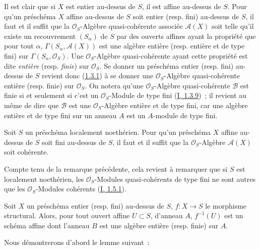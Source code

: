 \begin{env}[6.1.2]
\label{II.6.1.2-fr}
Il est clair que si $X$ est entier au-dessus de $S$, il est affine au-dessus
de $S$. Pour qu'un préschéma $X$ affine au-dessus de $S$ soit entier (resp.
fini) au-dessus de $S$, il faut et il suffit que la $\mathcal{O}_S$-Algèbre
quasi-cohérente associée $\mathcal{A}(X)$ soit telle qu'il existe un
recouvrement $(S_\alpha)$ de $S$ par des ouverts affines ayant la propriété
que pour tout $\alpha$, $\Gamma(S_\alpha,\mathcal{A}(X))$ est une algèbre
entière (resp. entière et de type fini) sur
$\Gamma(S_\alpha,\mathcal{O}_S)$. Une $\mathcal{O}_S$-Algèbre quasi-cohérente
ayant cette propriété est dite \emph{entière} (resp. \emph{finie}) sur
$\mathcal{O}_S$. Se donner un préschéma entier (resp. fini) au-dessus de $S$
revient donc (\hyperref[II.1.3.1-fr]{1.3.1}) à se donner une
$\mathcal{O}_S$-Algèbre quasi-cohérente entière (resp. finie) sur
$\mathcal{O}_S$. On notera qu'une $\mathcal{O}_S$-Algèbre quasi-cohérente
$\mathcal{B}$ est finie si et seulement si c'est un $\mathcal{O}_S$-Module de
type fini (\hyperref[I.1.3.9-fr]{I, 1.3.9})~; il revient au même de dire que
$\mathcal{B}$ est une $\mathcal{O}_S$-Algèbre entière et de type fini, car une
algèbre entière et de type fini sur un anneau $A$ est un $A$-module de type
fini.
\end{env}

\begin{proposition}[6.1.3]
\label{II.6.1.3-fr}
Soit $S$ un préschéma localement noethérien. Pour qu'un préschéma $X$ affine
au-dessus de $S$ soit fini au-dessus de $S$, il faut et il suffit que la
$\mathcal{O}_S$-Algèbre $\mathcal{A}(X)$ soit cohérente.
\end{proposition}

Compte tenu de la remarque précédente, cela revient à remarquer que si $S$ est
localement noethérien, les $\mathcal{O}_S$-Modules quasi-cohérents de type fini
ne sont autres que les $\mathcal{O}_S$-Modules cohérents
(\hyperref[I.1.5.1-fr]{I, 1.5.1}).

\begin{proposition}[6.1.4]
\label{II.6.1.4-fr}
Soit $X$ un préschéma entier (resp. fini) au-dessus de $S$, $f:X\to S$ le
morphisme structural. Alors, pour tout ouvert affine $U\subset S$, d'anneau
$A$, $f^{-1}(U)$ est un schéma affine dont l'anneau $B$ est une algèbre
entière (resp. finie) sur $A$.
\end{proposition}


Nous démontrerons d'abord le lemme suivant~:

